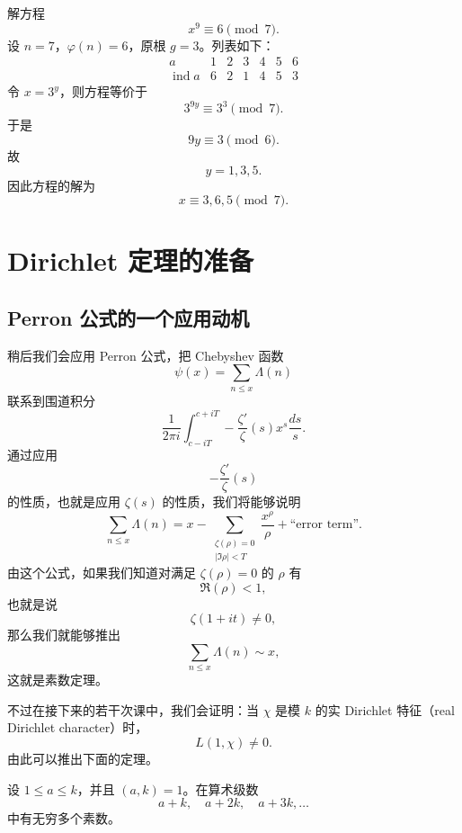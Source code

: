 \begin{example}[原文 例 7]
	解方程
	\[
		x^9\equiv 6\pmod 7.
	\]
	设 $n=7$，$\varphi(n)=6$，原根 $g=3$。列表如下：
	\[
	\begin{array}{c|cccccc}
		a & 1 & 2 & 3 & 4 & 5 & 6\\ \hline
		\operatorname{ind}a & 6 & 2 & 1 & 4 & 5 & 3
	\end{array}
	\]
	令 $x=3^y$，则方程等价于
	\[
		3^{9y}\equiv 3^3\pmod 7.
	\]
	于是
	\[
		9y\equiv 3\pmod 6.
	\]
	故
	\[
		y=1,3,5.
	\]
	因此方程的解为
	\[
		x\equiv 3,6,5\pmod 7.
	\]
\end{example}



\chapter{Dirichlet 定理的准备}
\label{chap:dirichlet-theorem-preparation}


\section{Perron 公式的一个应用动机}

\begin{remark}
	稍后我们会应用 Perron 公式，把 Chebyshev 函数
	\[
		\psi(x)=\sum_{n\leq x}\Lambda(n)
	\]
	联系到围道积分
	\[
		\frac{1}{2\pi i}\int_{c-iT}^{c+iT}
		-\frac{\zeta'}{\zeta}(s)x^s\frac{ds}{s}.
	\]
	通过应用
	\[
		-\frac{\zeta'}{\zeta}(s)
	\]
	的性质，也就是应用 $\zeta(s)$ 的性质，我们将能够说明
	\[
		\sum_{n\leq x}\Lambda(n)
		=
		x-\sum_{\substack{\zeta(\rho)=0\\ |\Im\rho|<T}}\frac{x^\rho}{\rho}
		+\text{``error term''}.
	\]
	由这个公式，如果我们知道对满足 $\zeta(\rho)=0$ 的 $\rho$ 有
	\[
		\Re(\rho)<1,
	\]
	也就是说
	\[
		\zeta(1+it)\neq 0,
	\]
	那么我们就能够推出
	\[
		\sum_{n\leq x}\Lambda(n)\sim x,
	\]
	这就是素数定理。
\end{remark}

不过在接下来的若干次课中，我们会证明：当 $\chi$ 是模 $k$ 的实 Dirichlet 特征（real Dirichlet character）时，
\[
	L(1,\chi)\neq 0.
\]
由此可以推出下面的定理。

\begin{theorem}[Dirichlet]
	设 $1\leq a\leq k$，并且 $(a,k)=1$。在算术级数
	\[
		a+k,\quad a+2k,\quad a+3k,\ldots
	\]
	中有无穷多个素数。
\end{theorem}

